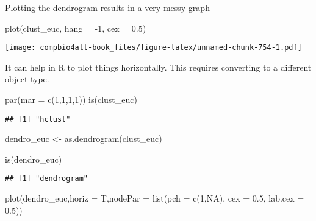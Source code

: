 \documentclass[
]{book}
\newenvironment{Shaded}{\begin{snugshade}}{\end{snugshade}}
\newcommand{\AttributeTok}[1]{\textcolor[rgb]{0.77,0.63,0.00}{#1}}
\newcommand{\ConstantTok}[1]{\textcolor[rgb]{0.00,0.00,0.00}{#1}}
\newcommand{\DecValTok}[1]{\textcolor[rgb]{0.00,0.00,0.81}{#1}}
\newcommand{\FloatTok}[1]{\textcolor[rgb]{0.00,0.00,0.81}{#1}}
\newcommand{\FunctionTok}[1]{\textcolor[rgb]{0.00,0.00,0.00}{#1}}
\newcommand{\NormalTok}[1]{#1}
\newcommand{\OtherTok}[1]{\textcolor[rgb]{0.56,0.35,0.01}{#1}}
\newcommand{\SpecialCharTok}[1]{\textcolor[rgb]{0.00,0.00,0.00}{#1}}
\begin{document}
Plotting the dendrogram results in a very messy graph

\begin{Shaded}
\begin{Highlighting}[]
\FunctionTok{plot}\NormalTok{(clust\_euc, }\AttributeTok{hang =} \SpecialCharTok{{-}}\DecValTok{1}\NormalTok{, }\AttributeTok{cex =} \FloatTok{0.5}\NormalTok{)}
\end{Highlighting}
\end{Shaded}

\texttt{[image: compbio4all-book\_files/figure-latex/unnamed-chunk-754-1.pdf]}

It can help in R to plot things horizontally. This requires converting to a different object type.

\begin{Shaded}
\begin{Highlighting}[]
\FunctionTok{par}\NormalTok{(}\AttributeTok{mar =} \FunctionTok{c}\NormalTok{(}\DecValTok{1}\NormalTok{,}\DecValTok{1}\NormalTok{,}\DecValTok{1}\NormalTok{,}\DecValTok{1}\NormalTok{))}
\FunctionTok{is}\NormalTok{(clust\_euc)}
\end{Highlighting}
\end{Shaded}

\begin{verbatim}
## [1] "hclust"
\end{verbatim}

\begin{Shaded}
\begin{Highlighting}[]
\NormalTok{dendro\_euc }\OtherTok{\textless{}{-}} \FunctionTok{as.dendrogram}\NormalTok{(clust\_euc)}

\FunctionTok{is}\NormalTok{(dendro\_euc)}
\end{Highlighting}
\end{Shaded}

\begin{verbatim}
## [1] "dendrogram"
\end{verbatim}

\begin{Shaded}
\begin{Highlighting}[]
\FunctionTok{plot}\NormalTok{(dendro\_euc,}\AttributeTok{horiz =}\NormalTok{ T,}\AttributeTok{nodePar =} \FunctionTok{list}\NormalTok{(}\AttributeTok{pch =} \FunctionTok{c}\NormalTok{(}\DecValTok{1}\NormalTok{,}\ConstantTok{NA}\NormalTok{), }
                                          \AttributeTok{cex =} \FloatTok{0.5}\NormalTok{, }
                                          \AttributeTok{lab.cex =} \FloatTok{0.5}\NormalTok{))}
\end{Highlighting}
\end{Shaded}
\end{document}

